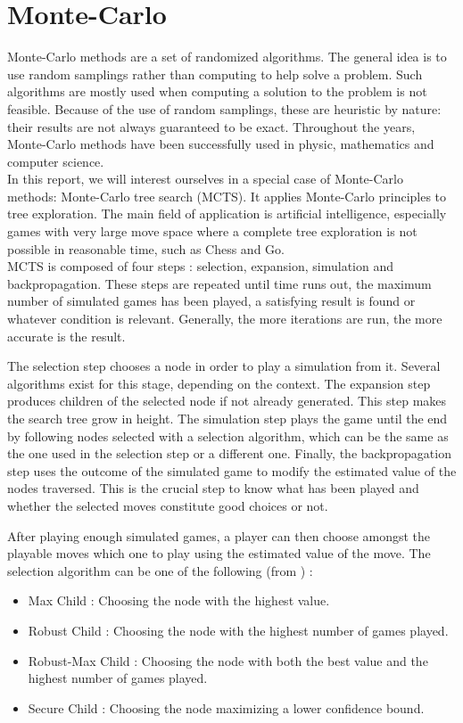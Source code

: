 \section{Monte-Carlo}

Monte-Carlo methods are a set of randomized algorithms. The general idea is to use random samplings rather than computing to help solve a problem. Such algorithms are mostly used when computing a solution to the problem is not feasible. Because of the use of random samplings, these are heuristic by nature: their results are not always guaranteed to be exact. Throughout the years, Monte-Carlo methods have been successfully used in physic, mathematics  and computer science.\\


In this report, we will interest ourselves in a special case of Monte-Carlo methods: Monte-Carlo tree search (MCTS). It applies Monte-Carlo principles to tree exploration. The main field of application is artificial intelligence, especially games with very large move space where a complete tree exploration is not possible in reasonable time, such as Chess and Go.\\

MCTS is composed of four steps : selection, expansion, simulation and backpropagation. These steps are repeated until time runs out, the maximum number of simulated games has been played, a satisfying result is found or whatever condition is relevant. Generally, the more iterations are run, the more accurate is the result.

The selection step chooses a node in order to play a simulation from it. Several algorithms exist for this stage, depending on the context. The expansion step produces children of the selected node if not already generated. This step makes the search tree grow in height. The simulation step plays the game until the end by following nodes selected with a selection algorithm, which can be the same as the one used in the selection step or a different one. Finally, the backpropagation step uses the outcome of the simulated game to modify the estimated value of the nodes traversed. This is the crucial step to know what has been played and whether the selected moves constitute good choices or not.

After playing enough simulated games, a player can then choose amongst the playable moves which one to play using the estimated value of the move. The selection algorithm can be one of the following (from \cite{ChaPHD}) :
\begin{itemize}
\item Max Child : Choosing the node with the highest value.
\item Robust Child : Choosing the node with the highest number of games played.
\item Robust-Max Child : Choosing the node with both the best value and the highest number of games played.
\item Secure Child : Choosing the node maximizing a lower confidence bound.\\
\end{itemize}


